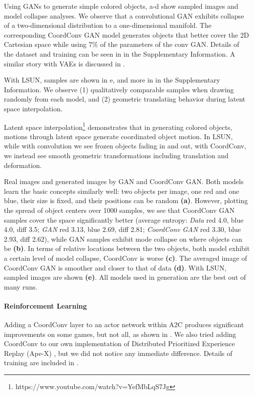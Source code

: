 \documentclass{article}
\newcommand{\capa}{\textbf{(a)}\xspace}
\newcommand{\capb}{\textbf{(b)}\xspace}
\newcommand{\capc}{\textbf{(c)}\xspace}
\newcommand{\capd}{\textbf{(d)}\xspace}
\newcommand{\cape}{\textbf{(e)}\xspace}
\begin{document}
Using GANs to generate simple colored objects,  a-d show sampled images and model collapse analyses. We observe that a convolutional GAN exhibits collapse of a two-dimensional distribution to a one-dimensional manifold. The corresponding CoordConv GAN model generates objects that better cover the 2D Cartesian space while using 7\% of the parameters of the conv GAN. Details of the dataset and training can be seen in  in the Supplementary Information. A similar story with VAEs is discussed in . 

With LSUN, samples are shown in e, and more in  in the Supplementary Information. We observe (1) qualitatively comparable samples when drawing randomly from each model, and (2) geometric translating behavior during latent space interpolation. 

Latent space interpolation\footnote{https://www.youtube.com/watch?v=YefMbLqS7Jg} demonstrates that in generating colored objects,  motions through latent space generate coordinated object motion. In LSUN, while with convolution we see frozen objects fading in and out, with CoordConv, we instead see smooth geometric transformations including translation and deformation.

 {Real images and generated images by GAN and CoordConv GAN. Both models learn the basic concepts similarly well: two objects per image, one red and one blue, their size is fixed, and their positions can be random \capa. 
However, plotting the spread of object centers over 1000 samples, we see that CoordConv GAN samples cover the space significantly better (average entropy: \textit{Data} red 4.0, blue 4.0, diff 3.5; \textit{GAN} red 3.13, blue 2.69, diff 2.81; \textit{CoordConv GAN} red 3.30, blue 2.93, diff 2.62), while GAN samples exhibit mode collapse on where objects can be \capb. In terms of relative locations between the two objects, both model exhibit a certain level of model collapse, CoordConv is worse \capc. The averaged image of CoordConv GAN is smoother and closer to that of data \capd. With LSUN, sampled images are shown \cape. All models used in generation are the best out of many runs.}






\vspace*{-.5em}
\paragraph{Reinforcement Learning}
Adding a CoordConv layer to an actor network within A2C \cite{mnih:a3c} produces significant improvements on some games, but not all, as shown in . We also tried adding CoordConv to our own implementation of Distributed Prioritized Experience Replay (Ape-X) \cite{horgan:apex}, but we did not notice any immediate difference. Details of training are included in . 
\end{document}
